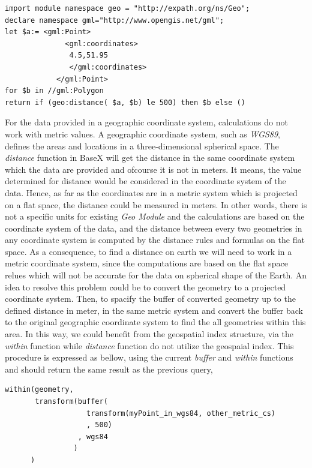 \documentclass[a4paper,12pt]{article}
\begin{document}
\begin{verbatim}
import module namespace geo = "http://expath.org/ns/Geo";
declare namespace gml="http://www.opengis.net/gml";
let $a:= <gml:Point>
              <gml:coordinates>
               4.5,51.95 
               </gml:coordinates>
            </gml:Point>
for $b in //gml:Polygon 
return if (geo:distance( $a, $b) le 500) then $b else ()
\end{verbatim}


For the data provided in a geographic coordinate system\cite{}, calculations do not work with metric values. A geographic coordinate system, such as \textit{WGS89}, defines the areas and locations in a three-dimensional spherical space. The \textit{distance} function in BaseX will get the distance in the same coordinate system which the data are provided and ofcourse it is not in meters. It means, the value determined for distance would be considered in the coordinate system of the data. Hence, as far as the coordinates are in a metric system which is projected on a flat space, the distance could be measured in meters. In other words, there is not a specific units for existing \textit{Geo Module} and the calculations are based on the coordinate system of the data, and the distance between every two geometries in any coordinate system is computed by the distance rules and formulas on the flat space. %
As a consequence, to find a distance on earth we will need to work in a metric coordinate system, since the computations are based on the flat space relues which will not be accurate for the data on spherical shape of the Earth. An idea to resolve this problem could be to convert the geometry to a projected coordinate system. Then, to spacify the buffer of converted geometry up to the defined distance in meter, in the same metric system and convert the buffer back to the original geographic coordinate system to find the all geometries within this area. In this way, we could benefit from the geospatial index structure, via the \textit{within} function while \textit{distance} function do not utilize the geospaial index. 
This procedure is expressed as bellow, using the current \textit{buffer} and \textit{within} functions and should return the same result as the previous query, 

\begin{verbatim} 
within(geometry,
       transform(buffer(
                   transform(myPoint_in_wgs84, other_metric_cs)
                   , 500)
                 , wgs84
                )
      )
\end{verbatim}
\end{document}
